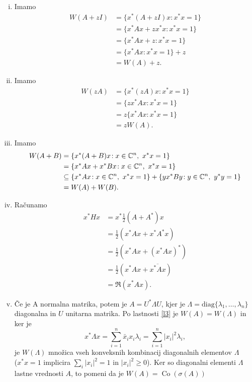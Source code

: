 \documentclass[12pt,a4paper]{amsart}\usepackage[slovene]{babel}%
\theoremstyle{definition}\newtheorem{definicija}{Definicija}[section]\newtheorem{primer}[definicija]{Primer}\newtheorem{opomba}[definicija]{Opomba}
\theoremstyle{plain}\newtheorem{lema}[definicija]{Lema}\newtheorem{izrek}[definicija]{Izrek}\newtheorem{trditev}[definicija]{Trditev}\newtheorem{posledica}[definicija]{Posledica}
\newcommand{\Co}{\operatorname{Co}} %
\begin{document}
{\begin{enumerate}[(i)]
\item Imamo \begin{align*}W(A +zI)&=\{x^\ast (A+zI)x\! : x^\ast x=1\}\\& = \{x^\ast Ax + zx^\ast x\! : x^\ast x =1\}\\ &= \{x^\ast Ax + z\! : x^\ast x=1\} \\&= \{x^\ast Ax\! : x^\ast x=1\} +z \\&= W(A) +z.\end{align*}\item Imamo \begin{align*}W(zA) &= \{x^\ast (zA)x\! : x^\ast x=1\}\\& = \{zx^\ast Ax\! :x^\ast x =1\}\\&= z\{x^\ast Ax\! :x^\ast x=1\}\\& = zW(A).\end{align*}
\item Imamo\begin{align*}W(A+B)&=\{x^\ast(A+B)x\! : x\in \C^n,\ x^\ast x=1\}\\& = \{x^\ast Ax +x^\ast Bx\! : x\in \C^n,\ x^\ast x=1\}\\& \subseteq \{x^\ast Ax\! : x\in \C^n,\ x^\ast x=1\}+\{yx^\ast By\! : y\in \C^n,\ y^\ast y=1\}\\& =W(A) + W(B).\end{align*}\item Računamo\begin{align*}x^\ast Hx &= x^\ast \frac{1}{2}(A+A^\ast)x \\ &=\frac{1}{2} (x^\ast Ax +x^\ast A^\ast x) \\ &=\frac{1}{2}(x^\ast Ax +(x^\ast Ax)^\ast) \\ &= \frac{1}{2}(x^\ast Ax +\overline{x^\ast Ax}) \\ &= \Re (x^\ast Ax).\end{align*}
\item Če je A normalna matrika, potem je $A=U^\ast \Lambda U$, kjer je $\Lambda = \text{diag}\{\lambda_1, \dots, \lambda_n\}$ diagonalna in $U$ unitarna matrika. Po lastnosti \ref{l3} je $W(A)=W(\Lambda)$ in ker je $$x^\ast \Lambda x = \sum_{i=1}^{n} \bar{x}_i x_i\lambda_i = \sum_{i=1}^{n} |x_i|^2 \lambda_i ,$$ je $W(\Lambda)$ množica vseh konveksnih kombinacij diagonalnih elementov $\Lambda$\\($x^\ast x=1$ implicira $ \sum_{i} |x_i|^2 =1$ in $|x_i|^2 \geq 0$). Ker so diagonalni elementi $\Lambda$ lastne vrednosti $A$, to pomeni da je $W(A) =\Co(\sigma(A))$

\end{enumerate}}
\end{document}
